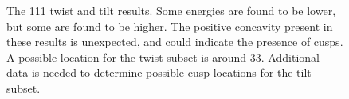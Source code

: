 \documentclass[twoside,senior]{BYUPhys}
\begin{document}
\begin{figure}[ht!]
 \centering
 
 \quad
 \caption[Results for the \textlangle{}111\textrangle{} fitting.]{\label{fig:111} The \textlangle{}111\textrangle{} twist \protect{} and tilt \protect{} results.  Some energies are found to be lower, but some are found to be higher.  The positive concavity present in these results is unexpected, and could indicate the presence of cusps.  A possible location for the twist subset is around 33\textdegree{}.  Additional data is needed to determine possible cusp locations for the tilt subset.}
 
\end{figure}
\end{document}
